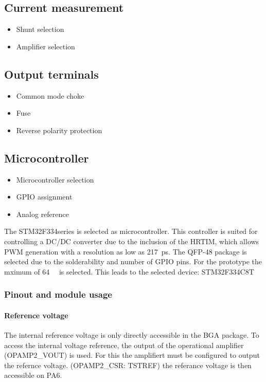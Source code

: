 \FloatBarrier

\subsection{Current measurement}
\label{sec_cur_meas}
\begin{itemize}
    \item Shunt selection
    \item Amplifier selection
\end{itemize}

\FloatBarrier

\subsection{Output terminals}
\label{sec_out_term}
\begin{itemize}
    \item Common mode choke
    \item Fuse
    \item Reverse polarity protection
\end{itemize}

\FloatBarrier

\subsection{Microcontroller}
\label{sec_microcontroller}
\begin{itemize}
    \item Microcontroller selection
    \item GPIO assignment
    \item Analog reference
\end{itemize}
The STM32F334series is selected as microcontroller. This controller is suited for controlling a DC/DC converter due to the inclusion of the \ac{HRTIM}, which allows \ac{PWM} generation with a resolution as low as \qty{217}{\pico\second}. The QFP-48 package is selected due to the solderability and number of \ac{GPIO} pins. For the prototype the mximum of \qty{64}{\kibi\byte} is selected. This leads to the selected device: STM32F334C8T

\subsubsection{Pinout and module usage}
\paragraph{Reference voltage}
The internal reference voltage is only directly accessible in the BGA package. To access the internal voltage reference, the output of the operational amplifier (OPAMP2\_VOUT) is used. For this the amplifiert must be configured to output the refernce voltage. (OPAMP2\_CSR: TSTREF) the referance voltage is then accessible on PA6. 

